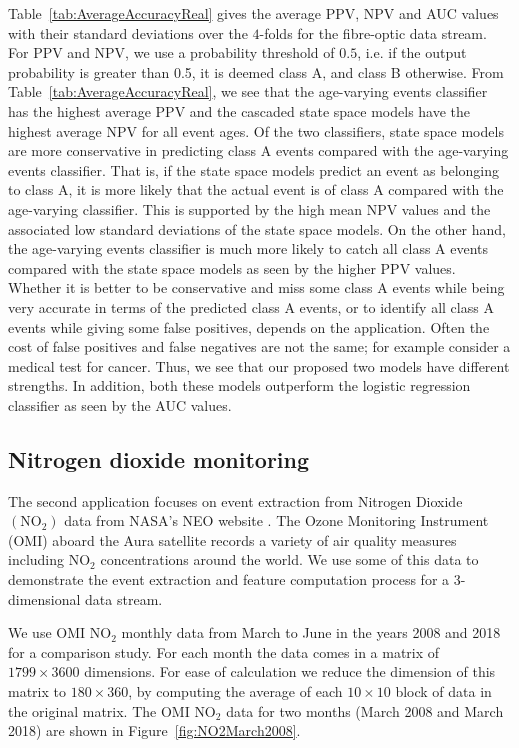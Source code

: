\documentclass[a4paper,11pt]{article}
\begin{document}
Table~\ref{tab:AverageAccuracyReal} gives the average PPV, NPV and AUC values with their standard deviations over the $4$-folds for the fibre-optic data stream. For PPV and NPV, we use a probability threshold of $0.5$, i.e. if the output probability is greater than 0.5, it is deemed class A, and class B otherwise. From Table~\ref{tab:AverageAccuracyReal}, we see that the age-varying events classifier has the highest average PPV and the cascaded state space models have the highest average NPV for all event ages. Of the two classifiers, state space models are more conservative in predicting class A events compared with the age-varying events classifier. That is, if the state space models predict an event as belonging to class A, it is more likely that the actual event is of class A compared with the age-varying classifier. This is supported by the high mean NPV values and the associated low standard deviations of the state space models. On the other hand, the age-varying events classifier is much more likely to catch all class A events compared with the state space models as seen by the higher PPV values. Whether it is better to be conservative and miss some class A events while being very accurate in terms of the predicted class A events, or to identify all class A events while giving some false positives, depends on the application. Often the cost of  false positives and false negatives are not the same; for example consider a medical test for cancer. Thus, we see that our proposed two models have different strengths. In addition, both these models outperform the logistic regression classifier as seen by the AUC values.

\subsection{Nitrogen dioxide monitoring}\label{sec:NO2Exp}

The second application focuses on event extraction from Nitrogen Dioxide $(\text{NO}_2)$ data from NASA's NEO website \cite{OMINO2}. The Ozone Monitoring Instrument (OMI) \cite{levelt2006ozone} aboard the Aura satellite records a variety of air quality measures including $\text{NO}_2$ concentrations around the world. We use some of this data to demonstrate the event extraction and feature computation process for a 3-dimensional data stream.

We use OMI $\text{NO}_2$ monthly data from March to June in the years 2008 and 2018 for a comparison study. For each month the data comes in a matrix of $1799 \times 3600$ dimensions. For ease of calculation we reduce the dimension of this matrix to $180 \times 360 $, by computing the average of each $10 \times 10$ block of data in the original matrix. The OMI $\text{NO}_2$ data for two months (March 2008 and March 2018) are shown in Figure~\ref{fig:NO2March2008}.
\end{document}
